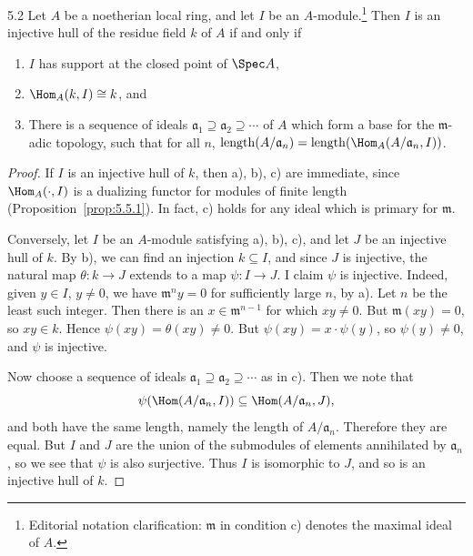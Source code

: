 \begin{booklemma}{5.2}\label{lem:6.5.2}
Let $A$ be a noetherian local ring, and let $I$ be an $A$-module.\footnote{Editorial notation clarification: $\mathfrak m$ in condition c) denotes the maximal ideal of $A$.} Then $I$ is an injective hull of the residue field $k$ of $A$ if and only if
\begin{enumerate}
\item[a)] $I$ has support at the closed point of $\Spec A$,
\item[b)] $\Hom_{A}(k,I)\cong k$, and
\item[c)] There is a sequence of ideals $\mathfrak{a}_1\supseteq\mathfrak{a}_2\supseteq\cdots$ of $A$ which form a base for the $\mathfrak{m}$-adic topology, such that for all $n$, $\operatorname{length}(A/\mathfrak{a}_n) = \operatorname{length}(\Hom_A(A/\mathfrak{a}_n, I))$.
\end{enumerate}
\end{booklemma}

\begin{proof}
If $I$ is an injective hull of $k$, then a), b), c) are immediate, since $\Hom_A(\cdot,I)$ is a dualizing functor for modules of finite length (Proposition~\ref{prop:5.5.1}). In fact, c) holds for any ideal which is primary for $\mathfrak{m}$.

Conversely, let $I$ be an $A$-module satisfying a), b), c), and let $J$ be an injective hull of $k$. By b), we can find an injection $k\subseteq I$, and since $J$ is injective, the natural map $\theta\colon k\to J$ extends to a map $\psi\colon I\to J$. I claim $\psi$ is injective. Indeed, given $y\in I$, $y\neq0$, we have $\mathfrak{m}^n y=0$ for sufficiently large $n$, by a). Let $n$ be the least such integer. Then there is an $x\in\mathfrak{m}^{n-1}$ for which $xy\neq0$. But $\mathfrak{m}(xy)=0$, so $xy\in k$. Hence $\psi(xy)=\theta(xy)\neq0$. But $\psi(xy)=x\cdot\psi(y)$, so $\psi(y)\neq0$, and $\psi$ is injective.

Now choose a sequence of ideals $\mathfrak{a}_1\supseteq\mathfrak{a}_2\supseteq\cdots$ as in c). Then we note that
\[
\psi(\Hom(A/\mathfrak{a}_n,I)) \subseteq \Hom(A/\mathfrak{a}_n,J),
\]
and both have the same length, namely the length of $A/\mathfrak{a}_n$. Therefore they are equal. But $I$ and $J$ are the union of the submodules of elements annihilated by $\mathfrak{a}_n$, so we see that $\psi$ is also surjective. Thus $I$ is isomorphic to $J$, and so is an injective hull of $k$.
\end{proof}

